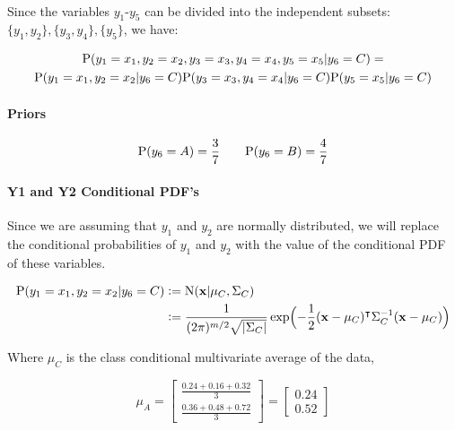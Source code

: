 \documentclass[12pt]{article}
\begin{document}
\begin{enumerate}[leftmargin=\labelsep]
\begin{enumerate}
        \paragraph{} Since the variables $y_1$-$y_5$ can be divided into the independent subsets: $\{y_1, y_2\}, \{y_3, y_4\}, \{y_5\}$, we have:

        \begin{multline}
            \textrm{P}(y_1 = x_1, y_2 = x_2, y_3 = x_3, y_4 = x_4, y_5 = x_5 | y_6 = C) = \\
            \textrm{P}(y_1 = x_1, y_2 = x_2 | y_6 = C)\textrm{P}(y_3 = x_3, y_4 = x_4|y_6 = C)\textrm{P}(y_5 = x_5|y_6 = C)
        \end{multline}

        \paragraph{Priors}
        \begin{equation}
            \textrm{P}(y_6 = A) = \frac{3}{7} \qquad \textrm{P}(y_6 = B) = \frac{4}{7}
        \end{equation}

        \paragraph{Y1 and Y2 Conditional PDF's}
        Since we are assuming that $y_1$ and $y_2$ are normally distributed, we will replace the conditional probabilities of $y_1$ and $y_2$ with the value of the conditional PDF of these variables.

        \begin{equation}
        \begin{split}
            \textrm{P}(y_1 = x_1, y_2 = x_2 | y_6 = C) &\vcentcolon= \textrm{N}(\mathbf{x} | \mu_C, \Sigma_C) \\
            &\vcentcolon= \frac{1}{(2\pi)^{m/2}\sqrt{|\Sigma_C|}}\exp\Bigl(-\frac{1}{2}(\mathbf{x}-\mu_C)^\intercal \Sigma_C^{-1} (\mathbf{x}-\mu_C)\Bigr)
        \end{split}
        \end{equation}

        Where $\mu_C$ is the class conditional multivariate average of the data,

        \begin{equation}
        \mu_A = \begin{bmatrix}
            \frac{0.24 + 0.16 + 0.32}{3} \\
            \frac{0.36 + 0.48 + 0.72}{3}
        \end{bmatrix} = \begin{bmatrix}
            0.24 \\
            0.52
        \end{bmatrix}
        \end{equation}


\end{enumerate}
\end{enumerate}
\end{document}
